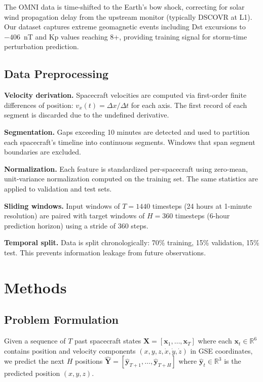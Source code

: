 \documentclass[twocolumn]{article}
\begin{document}
The OMNI data is time-shifted to the Earth's bow shock, correcting for
solar wind propagation delay from the upstream monitor (typically DSCOVR
at L1). Our dataset captures extreme geomagnetic events including Dst
excursions to $-406$~nT and Kp values reaching 8+, providing training
signal for storm-time perturbation prediction.

\subsection{Data Preprocessing}

\textbf{Velocity derivation.} Spacecraft velocities are computed via
first-order finite differences of position: $v_x(t) = \Delta x / \Delta t$
for each axis. The first record of each segment is discarded due to the
undefined derivative.

\textbf{Segmentation.} Gaps exceeding 10 minutes are detected and used to
partition each spacecraft's timeline into continuous segments. Windows that
span segment boundaries are excluded.

\textbf{Normalization.} Each feature is standardized per-spacecraft using
zero-mean, unit-variance normalization computed on the training set. The
same statistics are applied to validation and test sets.

\textbf{Sliding windows.} Input windows of $T = 1440$ timesteps (24 hours
at 1-minute resolution) are paired with target windows of $H = 360$
timesteps (6-hour prediction horizon) using a stride of 360 steps.

\textbf{Temporal split.} Data is split chronologically:
70\% training, 15\% validation, 15\% test. This prevents information
leakage from future observations.

\section{Methods}
\label{sec:methods}

\subsection{Problem Formulation}

Given a sequence of $T$ past spacecraft states
$\mathbf{X} = [\mathbf{x}_1, \ldots, \mathbf{x}_T]$ where each
$\mathbf{x}_t \in \mathbb{R}^6$ contains position and velocity components
$(x, y, z, \dot{x}, \dot{y}, \dot{z})$ in GSE coordinates, we predict
the next $H$ positions $\hat{\mathbf{Y}} = [\hat{\mathbf{y}}_{T+1},
\ldots, \hat{\mathbf{y}}_{T+H}]$ where $\hat{\mathbf{y}}_t \in
\mathbb{R}^3$ is the predicted position $(x, y, z)$.
\end{document}
